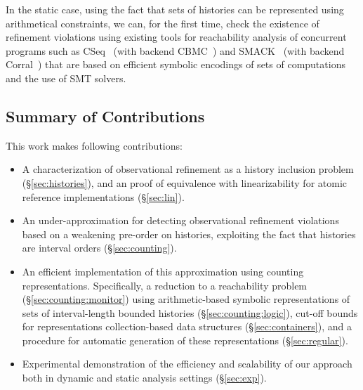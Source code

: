 In the static case, using the fact that sets of histories can be represented
using arithmetical constraints, we can, for the first time, check the existence
of refinement violations using existing tools for reachability analysis of
concurrent programs such as CSeq~\cite{conf/ase/FischerIP13} (with backend
CBMC~\cite{conf/tacas/KroeningT14}) and SMACK~\cite{conf/cav/RakamaricE14}
(with backend Corral~\cite{conf/cav/LalQL12}) that are based on efficient
symbolic encodings of sets of computations and the use of SMT solvers.

\subsection{Summary of Contributions}

This work makes following contributions:
\begin{itemize}

  \item A characterization of observational refinement as a history inclusion
  problem (\S\ref{sec:histories}), and an proof of equivalence with
  linearizability for atomic reference implementations (\S\ref{sec:lin}).

  \item An under-approximation for detecting observational refinement
  violations based on a weakening pre-order on histories, exploiting the fact
  that histories are interval orders (\S\ref{sec:counting}).

  \item An efficient implementation of this approximation using counting
  representations. Specifically, a reduction to a reachability problem
  (\S\ref{sec:counting:monitor}) using arithmetic-based symbolic
  representations of sets of interval-length bounded histories
  (\S\ref{sec:counting:logic}), cut-off bounds for representations
  collection-based data structures (\S\ref{sec:containers}), and a procedure
  for automatic generation of these representations (\S\ref{sec:regular}).

  \item Experimental demonstration of the efficiency and scalability of our
  approach both in dynamic and static analysis settings (\S\ref{sec:exp}).

\end{itemize}

